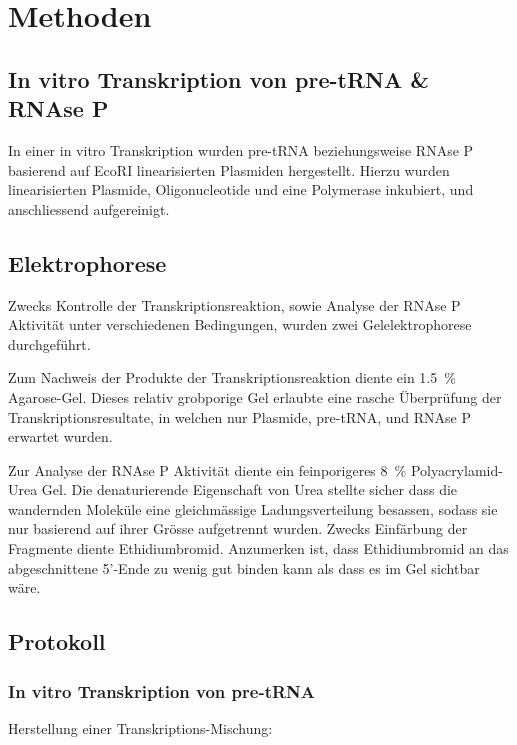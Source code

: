\documentclass[a4paper,english]{scrreprt}
\begin{document}
\chapter{Methoden}

\section{In vitro Transkription von pre-tRNA \& RNAse P}

In einer in vitro Transkription wurden pre-tRNA beziehungsweise RNAse P
basierend auf EcoRI linearisierten Plasmiden hergestellt. Hierzu wurden
linearisierten Plasmide, Oligonucleotide und eine Polymerase inkubiert, und
anschliessend aufgereinigt.

\section{Elektrophorese}

Zwecks Kontrolle der Transkriptionsreaktion, sowie Analyse der RNAse P
Aktivität unter verschiedenen Bedingungen, wurden zwei Gelelektrophorese
durchgeführt.

Zum Nachweis der Produkte der Transkriptionsreaktion diente ein
\SI{1.5}{\percent} Agarose-Gel. Dieses relativ grobporige Gel erlaubte eine
rasche Überprüfung der Transkriptionsresultate, in welchen nur Plasmide,
pre-tRNA, und RNAse P erwartet wurden.

Zur Analyse der RNAse P Aktivität diente ein feinporigeres \SI{8}{\percent}
Polyacrylamid-Urea Gel. Die denaturierende Eigenschaft von Urea stellte sicher
dass die wandernden Moleküle eine gleichmässige Ladungsverteilung besassen,
sodass sie nur basierend auf ihrer Grösse aufgetrennt wurden. Zwecks Einfärbung
der Fragmente diente Ethidiumbromid. Anzumerken ist, dass Ethidiumbromid an
das abgeschnittene 5'-Ende zu wenig gut binden kann als dass es im Gel sichtbar
wäre.

\section{Protokoll\cite{skriptv1}}

\subsection{In vitro Transkription von pre-tRNA}

Herstellung einer Transkriptions-Mischung:
\\
\end{document}
